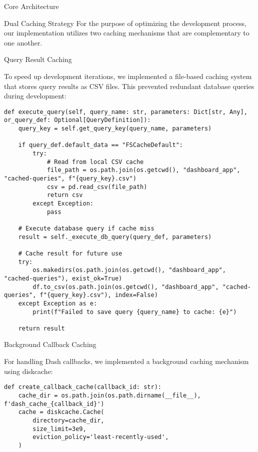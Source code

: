 \begin{section}{Core Architecture}
\begin{subsection}{Dual Caching Strategy}
		For the purpose of optimizing the development process, our implementation utilizes two caching mechanisms that are complementary to one another.

		\begin{subsubsection}{Query Result Caching}
			\label{subsubsec:implementation-core-architecture-query-cache}

			To speed up development iterations, we implemented a file-based caching system that stores query results as CSV files.
			This prevented redundant database queries during development:

			\begin{listing}[H]
				\caption{Query Result Caching Implementation}
				\begin{verbatim}
def execute_query(self, query_name: str, parameters: Dict[str, Any], or_query_def: Optional[QueryDefinition]):
    query_key = self.get_query_key(query_name, parameters)

    if query_def.default_data == "FSCacheDefault":
        try:
            # Read from local CSV cache
            file_path = os.path.join(os.getcwd(), "dashboard_app", "cached-queries", f"{query_key}.csv")
            csv = pd.read_csv(file_path)
            return csv
        except Exception:
            pass

    # Execute database query if cache miss
    result = self._execute_db_query(query_def, parameters)

    # Cache result for future use
    try:
        os.makedirs(os.path.join(os.getcwd(), "dashboard_app", "cached-queries"), exist_ok=True)
        df.to_csv(os.path.join(os.getcwd(), "dashboard_app", "cached-queries", f"{query_key}.csv"), index=False)
    except Exception as e:
        print(f"Failed to save query {query_name} to cache: {e}")

    return result
				\end{verbatim}
				\label{lst:dashboard-implementation-query-cache}
			\end{listing}
		\end{subsubsection}

		\begin{subsubsection}{Background Callback Caching}
			\label{subsubsec:implementation-core-architecture-callback-cache}

			For handling Dash callbacks, we implemented a background caching mechanism using diskcache:

			\begin{listing}[H]
				\caption{Background Callback Cache }
				\begin{verbatim}
def create_callback_cache(callback_id: str):
    cache_dir = os.path.join(os.path.dirname(__file__), f'dash_cache_{callback_id}')
    cache = diskcache.Cache(
        directory=cache_dir,
        size_limit=3e9,
        eviction_policy='least-recently-used',
    )


\end{verbatim}
\end{listing}
\end{subsubsection}
\end{subsection}
\end{section}
